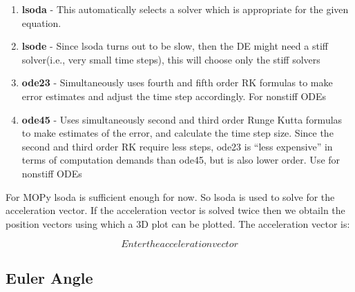 \begin{enumerate}
\item \textbf{lsoda} - This automatically selects a solver which is appropriate for the given equation.
\item \textbf{lsode} - Since lsoda turns out to be slow, then the DE might need a stiff solver(i.e., very small time steps), this will choose only the stiff solvers 
\item \textbf{ode23} -  Simultaneously uses fourth and fifth order RK formulas to make error estimates and adjust the
time step accordingly. For nonstiff ODEs
\item \textbf{ode45} - Uses simultaneously second and third order Runge Kutta formulas to make estimates of the
error, and calculate the time step size. Since the second and third order RK require less steps, ode23 is
“less expensive” in terms of computation demands than ode45, but is also lower order. Use for nonstiff
ODEs
\end{enumerate}
For MOPy lsoda is sufficient enough for now. So lsoda is used to solve for the acceleration vector. If the acceleration vector is solved twice then we obtailn the position vectors using which a 3D plot can be plotted. The acceleration vector is: 

$$Enter the acceleration vector$$

\subsection{Euler Angle}

